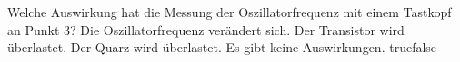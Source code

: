     {Welche Auswirkung hat die Messung der Oszillatorfrequenz mit einem Tastkopf an Punkt 3?}
    {Die Oszillatorfrequenz verändert sich.}
    {Der Transistor wird überlastet.}
    {Der Quarz wird überlastet.}
    {Es gibt keine Auswirkungen.}
    {true}{false}